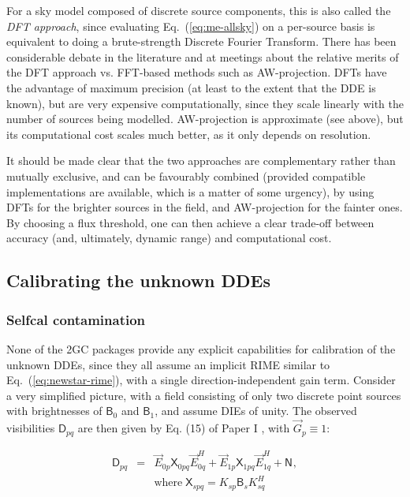 \documentclass{aa}
\newcommand{\herm}{H}
\newcommand{\jones}[2]{\vec {#1}_{#2}}
\newcommand{\jonesT}[2]{\vec {#1}^{\herm}_{#2}}
\newcommand{\coh}[2]{\mathsf{{#1}}_{{#2}}}
\begin{document}
For a sky model composed of discrete source components, this is also called the \emph{DFT approach}, since evaluating Eq.~(\ref{eq:me-allsky}) on a per-source basis is equivalent to doing a brute-strength Discrete Fourier Transform. There has been considerable debate in the literature and at meetings about the relative merits of the DFT approach vs. FFT-based methods such as AW-projection. DFTs have the advantage of maximum precision (at least to the extent that the DDE is known), but are very expensive computationally, since they scale linearly with the number of sources being modelled. AW-projection is approximate (see above), but its computational cost scales much better, as it only depends on resolution.

It should be made clear that the two approaches are complementary rather than mutually exclusive, and can be favourably combined (provided compatible implementations are available, which is a matter of some urgency), by using DFTs for the brighter sources in the field, and AW-projection for the fainter ones. By choosing a flux threshold, one can then achieve a clear trade-off between accuracy (and, ultimately, dynamic range) and computational cost. 

\subsection{Calibrating the unknown DDEs}

\subsubsection{Selfcal contamination}

None of the 2GC packages provide any explicit capabilities for calibration of the unknown DDEs, since they all assume an implicit RIME similar to Eq.~(\ref{eq:newstar-rime}), with a single direction-independent gain term. Consider a very simplified picture, with a field consisting of only two discrete point sources with brightnesses of $\coh{B}{0}$ and $\coh{B}{1}$, and assume DIEs of unity. The observed visibilities $\coh{D}{pq}$ are then given by Eq. (15) of Paper I \citep{RRIME1}, with $\jones{G}{p}\equiv1$:

\begin{eqnarray}\label{eq:selfcal-dpq}
\coh{D}{pq} & = & \jones{E}{0p} \coh{X}{0pq} \jonesT{E}{0q} + \jones{E}{1p} \coh{X}{1pq} \jonesT{E}{1q} + \coh{N}{}, \\
\nonumber && \mathrm{where}\; \coh{X}{spq} = K_{sp} \coh{B}{s} K^\herm_{sq}
\end{eqnarray}  
\end{document}
